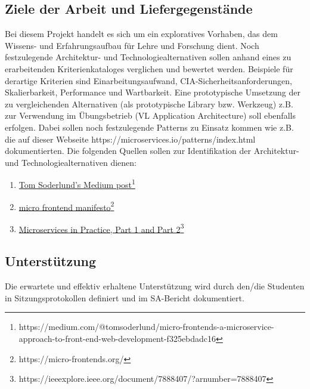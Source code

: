 \subsection{Ziele der Arbeit und Liefergegenstände}
Bei diesem Projekt handelt es sich um ein exploratives Vorhaben, das dem Wissens- und Erfahrungsaufbau für Lehre und Forschung dient. 
Noch festzulegende Architektur- und Technologiealternativen sollen anhand eines zu erarbeitenden Kriterienkataloges verglichen und bewertet werden. Beispiele für derartige Kriterien sind Einarbeitungsaufwand,  CIA-Sicherheitsanforderungen, Skalierbarkeit, Performance und Wartbarkeit. 
Eine prototypische Umsetzung der zu vergleichenden Alternativen (als prototypische Library bzw. Werkzeug) z.B. zur Verwendung im Übungsbetrieb (VL Application Architecture) soll ebenfalls erfolgen. Dabei sollen noch festzulegende Patterns zu Einsatz kommen wie z.B. die auf dieser Webseite https://microservices.io/patterns/index.html dokumentierten.  
Die folgenden Quellen sollen zur Identifikation der  Architektur- und Technologiealternativen dienen: 
\begin{enumerate}
    \item \href{https://medium.com/@tomsoderlund/micro-frontends-a-microservice-approach-to-front-end-web-development-f325ebdadc16}{Tom Soderlund's Medium post}\footnote{https://medium.com/@tomsoderlund/micro-frontends-a-microservice-approach-to-front-end-web-development-f325ebdadc16}
    \item \href{https://micro-frontends.org/}{micro frontend manifesto}\footnote{https://micro-frontends.org/}
    \item \href{https://ieeexplore.ieee.org/document/7888407/?arnumber=7888407}{Microservices in Practice, Part 1 and Part 2}\footnote{https://ieeexplore.ieee.org/document/7888407/?arnumber=7888407}
\end{enumerate}
 \subsection{Unterstützung}
Die erwartete und effektiv erhaltene Unterstützung wird durch den/die Studenten in Sitzungsprotokollen definiert und im SA-Bericht dokumentiert.

